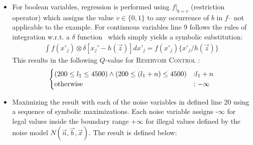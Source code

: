 \begin{itemize}
\item For boolean variables, regression is performed using $f|_{b=v}$ (restriction operator) which assigns the value $v \in \{ 0,1 \}$ to any occurrence of $b$ in $f$-- not applicable to the example. For continuous variables line 9 follows the rules of integration w.r.t. a $\delta$ function~\cite{sanner_uai11} which simply yields a symbolic substitution: 
{\footnotesize
\begin{align}
\int f(x'_j) \otimes \delta[x_j' - h(\vec{z})] dx'_j = f(x'_j) \{ x'_j / h(\vec{z}) \}\nonumber
\end{align}}
This results in the following $Q$-value for \textsc{Reservoir Control} : 
{\footnotesize
\begin{align*}
\begin{cases}
(200 \leq l_1 \leq 4500) \wedge (200 \leq (l_1 + n) \leq 4500) &: \hspace{-1mm} l_1 + n\\
\text{otherwise} &: -\infty\\
\end{cases}
\end{align*}
}
\item Maximizing the result with each of the noise variables in defined line 20 using a sequence of symbolic maximizations. Each noise variable assigns -$\infty$ for legal values inside the boundary range +$\infty$ for illegal values defined by the noise model $N(\vec{n},\vec{b},\vec{x})$. The result is defined below:

\end{itemize}
